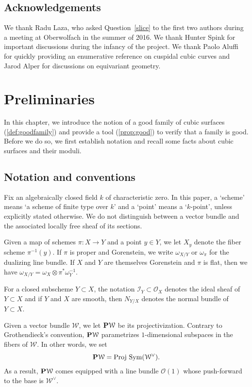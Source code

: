 \documentclass[12pt,reqno]{amsart}
\renewcommand{\k}{k}
\renewcommand{\to}{{\longrightarrow}}
\numberwithin{equation}{section}
\renewcommand{\O}{\mathcal O}
\newcommand{\Proj}{{\text{\rm Proj}\,}}
\begin{document}
\subsection{Acknowledgements}
We thank Radu Laza, who asked Question~\ref{slice} to the first two
authors during a meeting at Oberwolfach in the summer of 2016.  We
thank Hunter Spink for important discussions during the infancy of the
project.  We thank Paolo Aluffi for quickly providing an enumerative
reference on cuspidal cubic curves and Jarod Alper for discussions on
equivariant geometry.



  




\section{Preliminaries}
\label{sec:good}

In this chapter, we introduce the notion of a good family of cubic
surfaces (\autoref{def:goodfamily}) and provide a tool
(\autoref{prop:good}) to verify that a family is good.  Before we do
so, we first establish notation and recall some facts about cubic surfaces and their moduli.
\subsection{Notation and conventions}
\label{sec:notation-conventions}
Fix an algebraically closed field $\k$ of characteristic zero.  In
this paper, a `scheme' means `a scheme of finite type over $\k$' and a
`point' means a `$\k$-point', unless explicitly stated otherwise.  We
do not distinguish between a vector bundle and the associated locally
free sheaf of its sections.

Given a map of schemes $\pi \colon X \to Y$ and a point $y \in Y$, we
let $X_y$ denote the fiber scheme $\pi^{-1}(y)$.  If $\pi$ is proper
and Gorenstein, we write $\omega_{X/Y}$ or $\omega_\pi$ for the
dualizing line bundle.  If $X$ and $Y$ are themselves Gorenstein and
$\pi$ is flat, then we have
$\omega_{X/Y} = \omega_X \otimes \pi^*\omega_Y^{-1}$.

For a closed subscheme $Y \subset X$, the notation $\mathcal I_Y \subset \O_X$ denotes the ideal sheaf of $Y \subset X$ and if $Y$ and $X$ are smooth, then $N_{Y/X}$ denotes the normal bundle of $Y \subset X$.

Given a vector bundle $\mathcal W$, we let $\P \mathcal W$ be its
projectivization.  Contrary to Grothendieck's convention,
$\P \mathcal W$ parametrizes $1$-dimensional subspaces in the fibers
of $\mathcal W$.  In other words, we set
\[ \P \mathcal W = \Proj \Sym(\mathcal W^\vee).\] As a result,
$\P \mathcal W$ comes equipped with a line bundle $\O(1)$ whose
push-forward to the base is $\mathcal W^\vee$.
\end{document}
